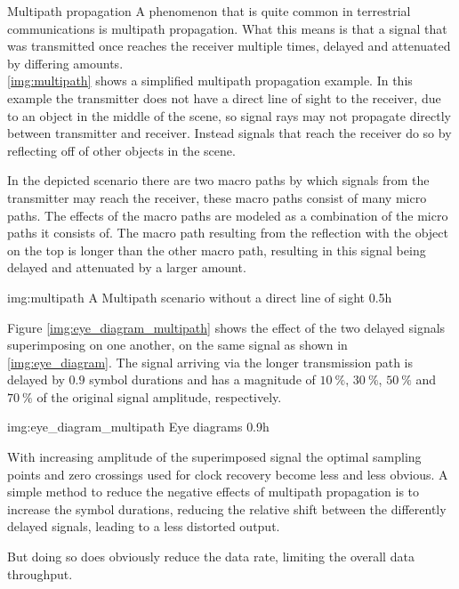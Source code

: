 \begin{subchapter}{Multipath propagation}
  A phenomenon that is quite common in terrestrial communications
  is multipath propagation.
  What this means is that a signal that was transmitted once reaches the
  receiver multiple times, delayed and attenuated by differing amounts. \\

  \autoref{img:multipath} shows a simplified multipath propagation example.
  In this example the transmitter does not have a direct line of
  sight to the receiver, due to an object in the middle of the scene,
  so signal rays may not propagate directly between transmitter and receiver.
  Instead signals that reach the receiver do
  so by reflecting off of other objects in the scene.

  In the depicted scenario there are two macro paths by which signals from
  the transmitter may reach the receiver, these macro paths consist of many
  micro paths.
  The effects of the macro paths are modeled as a combination of
  the micro paths it consists of.
  The macro path resulting from the reflection with the object on
  the top is longer than the other macro path, resulting in this signal being
  delayed and attenuated by a larger amount.

               {img:multipath}
               {A Multipath scenario without a direct line of sight}
               {0.5}{h}

  Figure \ref{img:eye_diagram_multipath} shows the effect of the
  two delayed signals superimposing on one another, on the same signal
  as shown in \autoref{img:eye_diagram}.
  The signal arriving via the longer transmission path
  is delayed by $0.9$ symbol durations and has a magnitude
  of $\SI{10}{\percent}$, $\SI{30}{\percent}$, $\SI{50}{\percent}$ and
  $\SI{70}{\percent}$ of the original signal amplitude, respectively.

               {img:eye_diagram_multipath}
               {Eye diagrams}
               {0.9}{h}

  With increasing amplitude of the superimposed signal the optimal
  sampling points and zero crossings used for clock recovery
  become less and less obvious.
  A simple method to reduce the negative effects of multipath propagation is to
  increase the symbol durations, reducing the relative shift between
  the differently delayed signals, leading to a less
  distorted output.

  But doing so does obviously reduce the data rate,
  limiting the overall data throughput.
\end{subchapter}

